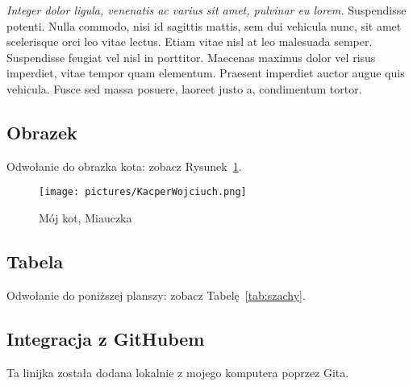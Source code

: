 \textit{Integer dolor ligula, venenatis ac varius sit amet, pulvinar eu lorem.} Suspendisse potenti. Nulla commodo, nisi id sagittis mattis, sem dui vehicula nunc, sit amet scelerisque orci leo vitae lectus. Etiam vitae nisl at leo malesuada semper. Suspendisse feugiat vel nisl in porttitor. Maecenas maximus dolor vel risus imperdiet, vitae tempor quam elementum. Praesent imperdiet auctor augue quis vehicula. Fusce sed massa posuere, laoreet justo a, condimentum tortor.

\subsection{Obrazek}
Odwołanie do obrazka kota: zobacz Rysunek~\ref{fig:miauczka}.
\begin{figure}[htbp]
    \centering
    \texttt{[image: pictures/KacperWojciuch.png]}
    \caption{Mój kot, Miauczka}
    \label{fig:miauczka}
\end{figure}

\subsection{Tabela}
Odwołanie do poniższej planszy: zobacz Tabelę~\ref{tab:szachy}.


\subsection{Integracja z GitHubem}
Ta linijka została dodana lokalnie z mojego komputera poprzez Gita.

